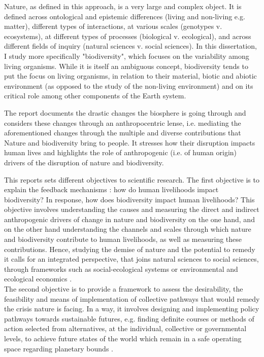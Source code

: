Nature, as defined in this approach, is a very large and complex object.
It is defined across ontological and epistemic differences (living and non-living e.g. matter), different types of interactions, at various scales (genotypes v. ecosystems), at different types of processes (biological v. ecological), and across different fields of inquiry (natural sciences v. social sciences). In this dissertation, I study more specifically "biodiversity", which focuses on the variability among living organisms. While it is itself an ambiguous concept, biodiversity tends to put the focus on living organisms, in relation to their material, biotic and abiotic environment (as opposed to the study of the non-living environment) and on its critical role among other components of the Earth system.

The \cite{ipbes_2022_6417333} report documents the drastic changes the biosphere is going through and considers these changes through an anthropocentric lense, i.e. mediating the aforementioned changes through the multiple and diverse contributions that Nature and biodiversity bring to people. It stresses how their disruption impacts human lives and highlights the role of anthropogenic (i.e. of human origin) drivers of the disruption of nature and biodiversity. 
 
This reports sets different objectives to scientific research. The first objective is to explain the feedback mechanisms : how do human livelihoods impact biodiversity? In response, how does biodiversity impact human livelihoods? This objective involves understanding the causes and measuring the direct and indirect anthropogenic drivers of change in nature and biodiversity on the one hand, and on the other hand understanding the channels and scales through which nature and biodiversity contribute to human livelihoods, as well as measuring these contributions. Hence, studying the demise of nature and the potential to remedy it calls for an integrated perspective, that joins natural sciences to social sciences, through frameworks such as social-ecological systems \citep{Ostrom2009} or environmental and ecological economics \citep{daly_ecological_2007}. 
\\
The second objective is to provide a framework to assess the desirability, the feasibility and means of implementation of collective pathways that would remedy the crisis nature is facing. In a way, it involves designing and implementing policy pathways towards sustainable futures, e.g. finding definite courses or methods of action selected from alternatives, at the individual, collective or governmental levels, to achieve future states of the world which remain in a safe operating space regarding planetary bounds \citep{rockstrom2009safe,steffen_2015_planetary}.


